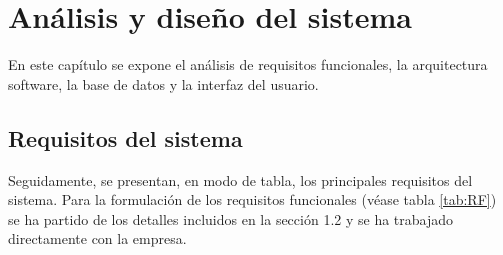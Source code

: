 \chapter{Análisis y diseño del sistema}

En este capítulo se expone el análisis de requisitos funcionales, la arquitectura software, la base de datos y la interfaz del usuario.

\section{Requisitos del sistema}
\label{section-requisitos}

Seguidamente, se presentan, en modo de tabla, los principales requisitos del sistema. Para la formulación de los requisitos funcionales (véase tabla \ref{tab:RF}) se ha partido de los detalles incluidos en la sección 1.2 y se ha trabajado directamente con la empresa.



